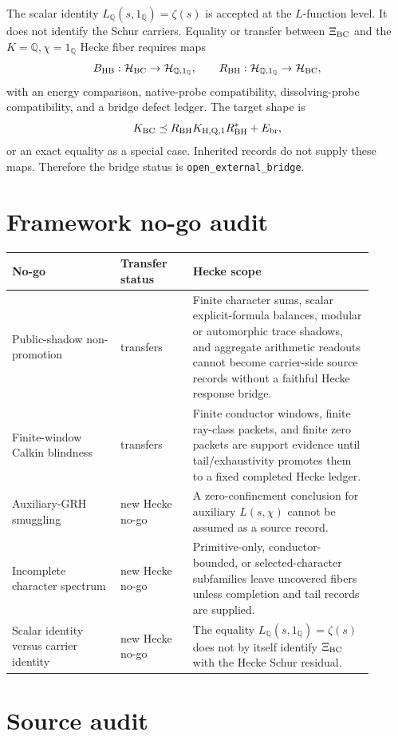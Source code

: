 \documentclass[11pt]{article}
\newcommand{\Q}{\mathbb Q}
\newcommand{\XiBC}{\Xi_{\rm BC}}
\begin{document}
The scalar identity \(L_\Q(s,1_\Q)=\zeta(s)\) is accepted at the \(L\)-function level.  It does not identify the Schur carriers.  Equality or transfer between \(\XiBC\) and the \(K=\Q,\chi=1_\Q\) Hecke fiber requires maps
\[
  B_{\rm HB}:\mathcal H_{\rm BC}\to \mathcal H_{\Q,1_\Q},
  \qquad
  R_{\rm BH}:\mathcal H_{\Q,1_\Q}\to \mathcal H_{\rm BC},
\]
with an energy comparison, native-probe compatibility, dissolving-probe compatibility, and a bridge defect ledger.  The target shape is
\[
  K_{\rm BC}\preceq R_{\rm BH}K_{\rm H,Q,1}R_{\rm BH}^*+E_{\rm br},
\]
or an exact equality as a special case.  Inherited records do not supply these maps.  Therefore the bridge status is \texttt{open\_external\_bridge}.

\section{Framework no-go audit}

\begin{center}
\begin{tabular}{p{0.27\linewidth}p{0.18\linewidth}p{0.45\linewidth}}
\toprule
No-go & Transfer status & Hecke scope\\
\midrule
Public-shadow non-promotion & transfers & Finite character sums, scalar explicit-formula balances, modular or automorphic trace shadows, and aggregate arithmetic readouts cannot become carrier-side source records without a faithful Hecke response bridge.\\
Finite-window Calkin blindness & transfers & Finite conductor windows, finite ray-class packets, and finite zero packets are support evidence until tail/exhaustivity promotes them to a fixed completed Hecke ledger.\\
Auxiliary-GRH smuggling & new Hecke no-go & A zero-confinement conclusion for auxiliary \(L(s,\chi)\) cannot be assumed as a source record.\\
Incomplete character spectrum & new Hecke no-go & Primitive-only, conductor-bounded, or selected-character subfamilies leave uncovered fibers unless completion and tail records are supplied.\\
Scalar identity versus carrier identity & new Hecke no-go & The equality \(L_\Q(s,1_\Q)=\zeta(s)\) does not by itself identify \(\XiBC\) with the Hecke Schur residual.\\
\bottomrule
\end{tabular}
\end{center}

\section{Source audit}
\end{document}
